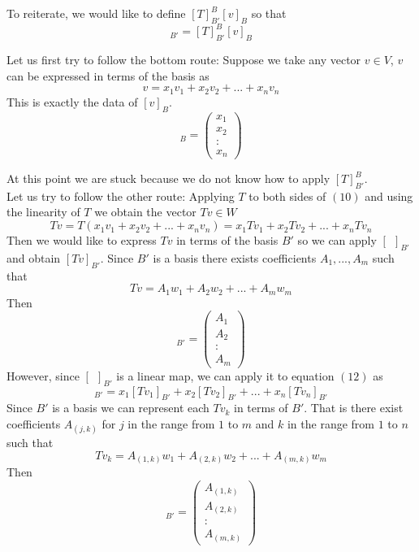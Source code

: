 \documentclass{article}
\theoremstyle{problemstyle}
\begin{document}
To reiterate, we would like to define $[T]^B_{B'} [v]_B$  so that \begin{equation}
    [Tv]_{B'} = [T]^B_{B'} [v]_B 
\end{equation}

Let us first try to follow the bottom route: Suppose we take any vector $v \in V$, $v$ can be expressed in terms of the basis as \begin{equation}v = x_1v_1+x_2v_2+...+x_nv_n\end{equation} This is exactly the data of $[v]_B$. 
\begin{equation}
 [v]_{B}  =
\begin{pmatrix} x_1 \\ x_2 \\ : \\ x_n \end{pmatrix}
\end{equation}

At this point we are stuck because we do not know how to apply $[T]^B_{B'}$.\\

Let us try to follow the other route:  Applying $T$ to both sides of $(10)$ and using the linearity of $T$ we obtain the vector $Tv \in W$ 
\begin{equation} Tv = T(x_1v_1+x_2v_2+...+x_nv_n) = x_1Tv_1+x_2Tv_2+...+x_nTv_n \end{equation} %
Then we would like to express $Tv$ in terms of the basis $B'$ so we can apply $[ \ \ ]_{B'}$ and obtain $[Tv]_{B'}$. Since $B'$ is a basis there exists coefficients $A_1,...,A_m$ such that $$Tv = A_1w_1+A_2w_2+...+A_mw_m$$ Then 
\begin{equation}
 [Tv]_{B'}  =
\begin{pmatrix} A_1 \\ A_2 \\ : \\ A_m \end{pmatrix}
\end{equation}
However, since $[ \ \ ]_{B'}$ is a linear map, we can apply it to equation $(12)$ as  \begin{equation}[Tv]_{B'} = x_1[Tv_1]_{B'}+x_2[Tv_2]_{B'}+...+x_n[Tv_n]_{B'}\end{equation} Since $B'$ is a basis we can represent each $Tv_k$ in terms of $B'$. That is there exist coefficients $A_{(j,k)}$ for $j$ in the range from $1$ to $m$ and  $k$ in the range from $1$ to $n$ such that \begin{equation}
Tv_k = A_{(1,k)}w_1 + A_{(2,k)}w_2 + ... + A_{(m,k)}w_m\end{equation} Then   \begin{equation}
 [Tv_k]_{B'}  =
\begin{pmatrix} A_{(1,k)} \\A_{(2,k)} \\ : \\ A_{(m,k)} \end{pmatrix}
\end{equation}
\end{document}
